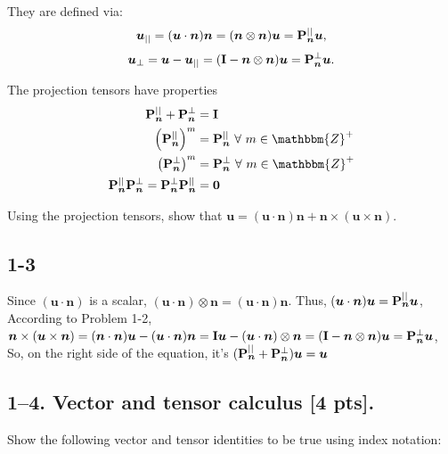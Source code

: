 They are defined via:
\begin{equation*}
    \bm{u}_{||} = (\bm{u} \cdot \bm{n}) \bm{n} = (\bm{n} \otimes \bm{n}) \bm{u} = \mathbf{P}_{\bm{n}}^{||} \bm{u},
\end{equation*}
\begin{equation*}
    \bm{u}_{\perp} = \bm{u} - \bm{u}_{||} = (\mathbf{I} - \bm{n} \otimes \bm{n}) \bm{u} = \mathbf{P}_{\bm{n}}^{\perp} \bm{u}.
\end{equation*}

The projection tensors have properties
\begin{align*}
    \bn{P}_{\bm{n}}^{||} + \bn{P}_{\bm{n}}^{\perp} &= \bn{I} \\
    \left(\bn{P}_{\bm{n}}^{||} \right)^m &= \bn{P}_{\bm{n}}^{||} ~\forall ~m \in \mathbbm{Z}^+\\
    \left(\bn{P}_{\bm{n}}^{\perp} \right)^m &= \bn{P}_{\bm{n}}^{\perp} ~\forall ~m \in \mathbbm{Z}^+\\
    \bn{P}_{\bm{n}}^{||} \bn{P}_{\bm{n}}^{\perp} = \bn{P}_{\bm{n}}^{\perp} \bn{P}_{\bm{n}}^{||}  &= \bn{0}
\end{align*}

Using the projection tensors, show that $\bm{u} = (\bm{u} \cdot \bm{n}) \bm{n} + \bm{n} \times (\bm{u} \times \bm{n} )$.
\subsection*{1-3}

Since $(\bm{u} \cdot \bm{n})$ is a scalar, $(\bm{u} \cdot \bm{n})\otimes\bm{n} = (\bm{u} \cdot \bm{n})\bm{n}$. Thus, $(\bm{u} \cdot \bm{n})\bm{u} = \mathbf{P}_{\bm{n}}^{||} \bm{u}$, \\
According to Problem 1-2, $ \bm{n} \times (\bm{u} \times \bm{n} ) = (\bm{n}\cdot \bm{n})\bm{u}-(\bm{u}\cdot\bm{n})\bm{n} = \mathbf{I}\bm{u}-(\bm{u} \cdot \bm{n})\otimes\bm{n}=(\mathbf{I} - \bm{n} \otimes \bm{n}) \bm{u} = \mathbf{P}_{\bm{n}}^{\perp} \bm{u} $, \\
So, on the right side of the equation, it's $(\mathbf{P}_{\bm{n}}^{||}+\mathbf{P}_{\bm{n}}^{\perp})\bm{u} = \bm{u}$

\bigskip
\subsection*{1--4. \textbf{Vector and tensor calculus} [4 pts].} Show the following vector and tensor identities to be true using index notation:

